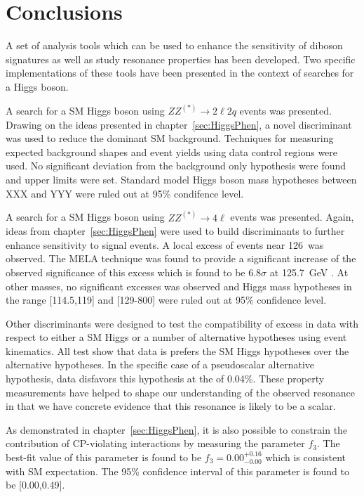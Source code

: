 \chapter{Conclusions}
\label{sec:Conclusions}

A set of analysis tools which can be used to enhance the
sensitivity of diboson signatures as well as study resonance
properties has been developed.  Two specific implementations 
of these tools have been presented in the context of searches
for a Higgs boson. 

A search for a SM Higgs boson using $ZZ^{(*)}\to2\ell2q$ events
was presented.  
Drawing on the ideas presented in chapter~\ref{sec:HiggsPhen},
a novel discriminant was used to reduce the dominant SM
background. 
Techniques for measuring expected background
shapes and event yields using data control regions were used.
No significant deviation from the background 
only hypothesis were found and upper limits were set.
Standard model Higgs boson mass hypotheses between XXX and YYY
were ruled out at 95\% condifence level.

A search for a SM Higgs boson using $ZZ^{(*)}\to4\ell$ events
was presented.  Again, ideas from chapter~\ref{sec:HiggsPhen} 
were used to build discriminants to further enhance sensitivity
to signal events.  A local excess of events near 126~\GeV was
observed.  The MELA technique was found to provide a
significant increase of the observed significance of this 
excess which is found to be $6.8\sigma$ at 125.7~GeV .
At other masses, no significant excesses was observed 
and Higgs mass hypotheses in the range [114.5,119] and [129-800]
were ruled out at 95\% confidence level. 

Other discriminants were designed to test the
compatibility of excess in data with respect to either
a SM Higgs or
a number of alternative hypotheses using event kinematics.  All 
test show that data is prefers the SM Higgs hypotheses over
the alternative hypotheses.  In the specific case of a
pseudoscalar alternative hypothesis, data disfavors this
hypothesis at the of 0.04\%.  These property
measurements have helped to shape our understanding of the
observed resonance in that we have concrete evidence that 
this resonance is likely to be a scalar.  

As demonstrated in chapter~\ref{sec:HiggsPhen}, it is also
possible to constrain the contribution of CP-violating 
interactions by measuring the parameter $f_{3}$.  The best-fit
value of this parameter is found to be $f_{3}=0.00^{+0.16}_{-0.00}$
which is consistent with SM expectation.  The 95\% confidence 
interval of this parameter is found to be [0.00,0.49].

